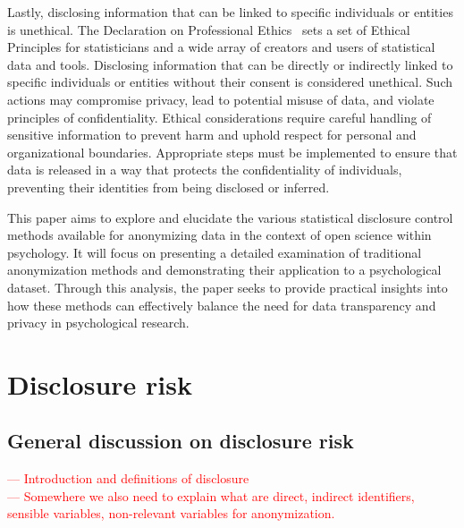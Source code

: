 \documentclass{article}
\begin{document}
Lastly, disclosing information that can be linked to specific individuals or entities is unethical. The Declaration on Professional Ethics~\cite{2010_ISI} sets a set of Ethical Principles for statisticians and a wide array of creators and users of statistical data and tools. 
Disclosing information that can be directly or indirectly linked to specific individuals or entities without their consent is considered unethical. Such actions may compromise privacy, lead to potential misuse of data, and violate principles of confidentiality. Ethical considerations require careful handling of sensitive information to prevent harm and uphold respect for personal and organizational boundaries. Appropriate steps must be implemented to ensure that data is released in a way that protects the confidentiality of individuals, preventing their identities from being disclosed or inferred.
\newline

This paper aims to explore and elucidate the various statistical disclosure control methods available for anonymizing data in the context of open science within psychology. 
It will focus on presenting a detailed examination of traditional anonymization methods and demonstrating their application to a psychological dataset. Through this analysis, the paper seeks to provide practical insights into how these methods can effectively balance the need for data transparency and privacy in psychological research.

\section{Disclosure risk}

\subsection{General discussion on disclosure risk}

\textcolor{red}{— Introduction and definitions of disclosure} \\
\textcolor{red}{— Somewhere we also need to explain what are direct, indirect identifiers, sensible variables, non-relevant variables for anonymization.}
\end{document}
